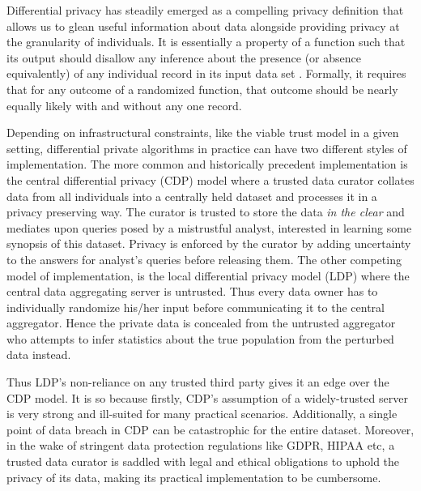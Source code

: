 Differential privacy has steadily emerged as a compelling privacy definition that allows us to glean useful information about data alongside providing privacy at the granularity of individuals. %
It is essentially a property of a function such that its output should disallow any inference about the
 presence (or absence equivalently) of any individual record in its input data set \cite{dwork}. 
Formally, it requires that for any outcome of a randomized function, that outcome should be nearly equally likely with and without any one record. \par
Depending on infrastructural constraints, like the viable trust model in a given setting, differential private algorithms in practice can have two different styles of implementation.  The more common and historically precedent implementation is the central differential privacy (\textsf{CDP}) model where a trusted data curator collates data from all individuals into a centrally held dataset and processes it in a privacy preserving way. %
 The curator is trusted to store the data \emph{in the clear} and mediates upon queries posed by a mistrustful analyst, interested in learning some synopsis of this dataset. Privacy is enforced by the curator by adding uncertainty to the answers for analyst's queries before releasing them. The other competing model of implementation, is the local differential privacy model (\textsf{LDP}) where the central data aggregating server is untrusted. Thus every data owner has to individually randomize his/her input before communicating it to the central aggregator. Hence the private data is concealed from the untrusted aggregator who attempts to infer statistics about the true population from the perturbed data instead. 
 \par  Thus \textsf{LDP}'s non-reliance on any trusted third party  gives it an edge over the \textsf{CDP} model. It is so because firstly, \textsf{CDP}'s assumption of a widely-trusted server is very strong and ill-suited for many practical scenarios. Additionally, a single point of data breach in \textsf{CDP} can be catastrophic for the entire dataset. Moreover, in the wake of stringent data protection regulations like \textsf{GDPR}, \textsf{HIPAA} etc, a trusted data curator is saddled with legal and ethical obligations to uphold the privacy of its data, making its practical implementation to be cumbersome.
  
